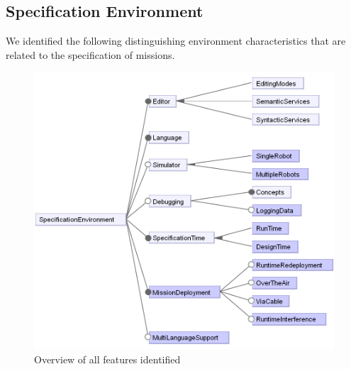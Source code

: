 \subsection{Specification Environment}\label{sec:envfeatures}
\noindent
We identified the following distinguishing environment characteristics that are related to the specification of missions.

\begin{figure}[t]
     \centering
    \includegraphics[width=\columnwidth]{fig/toplevelfeatures.png}
			\vspace{-.3cm}
      \caption{Overview of all features identified%
      }
      \label{fig:featuremodel}
			\vspace{-.4cm}
\end{figure}

